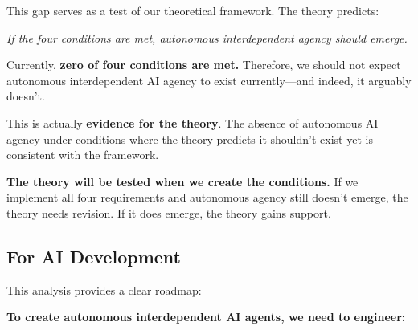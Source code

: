 \documentclass[11pt,a4paper]{article}
\begin{document}
This gap serves as a test of our theoretical framework. The theory predicts:

\textit{If the four conditions are met, autonomous interdependent agency should emerge.}

Currently, \textbf{zero of four conditions are met.} Therefore, we should not expect autonomous interdependent AI agency to exist currently---and indeed, it arguably doesn't.

This is actually \textbf{evidence for the theory}. The absence of autonomous AI agency under conditions where the theory predicts it shouldn't exist yet is consistent with the framework.

\textbf{The theory will be tested when we create the conditions.} If we implement all four requirements and autonomous agency still doesn't emerge, the theory needs revision. If it does emerge, the theory gains support.

\subsection{For AI Development}

This analysis provides a clear roadmap:

\textbf{To create autonomous interdependent AI agents, we need to engineer:}
\end{document}
